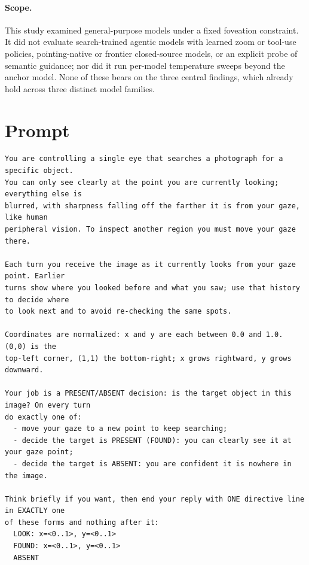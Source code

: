 \documentclass[runningheads]{llncs}
\begin{document}
\paragraph{Scope.} This study examined general-purpose models under a fixed foveation constraint. It did
not evaluate search-trained agentic models with learned zoom or tool-use policies, pointing-native or
frontier closed-source models, or an explicit probe of semantic guidance; nor did it run per-model
temperature sweeps beyond the anchor model. None of these bears on the three central findings, which
already hold across three distinct model families.

\clearpage
\section{Prompt}\label{sec:prompt}

\lstset{style=prompt}
\begin{lstlisting}
You are controlling a single eye that searches a photograph for a specific object.
You can only see clearly at the point you are currently looking; everything else is
blurred, with sharpness falling off the farther it is from your gaze, like human
peripheral vision. To inspect another region you must move your gaze there.

Each turn you receive the image as it currently looks from your gaze point. Earlier
turns show where you looked before and what you saw; use that history to decide where
to look next and to avoid re-checking the same spots.

Coordinates are normalized: x and y are each between 0.0 and 1.0. (0,0) is the
top-left corner, (1,1) the bottom-right; x grows rightward, y grows downward.

Your job is a PRESENT/ABSENT decision: is the target object in this image? On every turn
do exactly one of:
  - move your gaze to a new point to keep searching;
  - decide the target is PRESENT (FOUND): you can clearly see it at your gaze point;
  - decide the target is ABSENT: you are confident it is nowhere in the image.

Think briefly if you want, then end your reply with ONE directive line in EXACTLY one
of these forms and nothing after it:
  LOOK: x=<0..1>, y=<0..1>
  FOUND: x=<0..1>, y=<0..1>
  ABSENT
\end{lstlisting}





\end{document}
